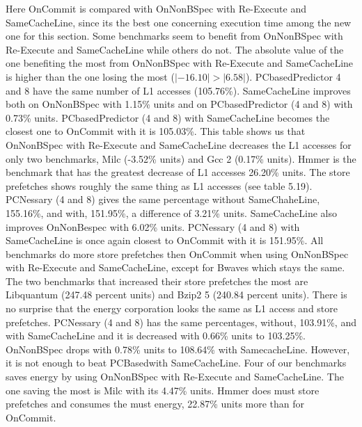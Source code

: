 Here OnCommit is compared with OnNonBSpec with Re-Execute and SameCacheLine, since its the best one concerning execution time among the new one for
this section. Some benchmarks seem to benefit from OnNonBSpec with Re-Execute and SameCacheLine while others do not. The absolute value of the one benefiting
the most from OnNonBSpec with Re-Execute and SameCacheLine is higher than the
one losing the most ($| − 16.10| > |6.58|$).
\resAcc
{}
PCbasedPredictor 4 and 8 have the same number of L1 accesses (105.76\%). SameCacheLine improves both on OnNonBSpec with 1.15\% units and on PCbasedPredictor (4 and 8) with 0.73\% units. PCbasedPredictor (4 and 8) with SameCacheLine
becomes the closest one to OnCommit with it is 105.03\%.
This table shows us that OnNonBSpec with Re-Execute and SameCacheLine decreases the L1 accesses for only two benchmarks, Milc (-3.52\% units) and Gcc 2 (0.17\% units). Hmmer is the benchmark that has the greatest decrease of L1 accesses
26.20\% units.
\resSp
{}
The store prefetches shows roughly the same thing as L1 accesses (see table 5.19).
PCNessary (4 and 8) gives the same percentage without SameChaheLine, 155.16\%,
and with, 151.95\%, a difference of 3.21\% units. SameCacheLine also improves OnNonBespec with 6.02\% units. PCNessary (4 and 8) with SameCacheLine is once again
closest to OnCommit with it is 151.95\%.
All benchmarks do more store prefetches then OnCommit when using OnNonBSpec with Re-Execute and SameCacheLine, except for Bwaves which stays the same.
The two benchmarks that increased their store prefetches the most are Libquantum
(247.48 percent units) and Bzip2 5 (240.84 percent units).
\resEnergy
{}
There is no surprise that the energy corporation looks the same as L1 access and
store prefetches. PCNessary (4 and 8) has the same percentages, without, 103.91\%,
and with SameCacheLine and it is decreased with 0.66\% units to 103.25\%. OnNonBSpec drops with 0.78\% units to 108.64\% with SamecacheLine. However, it is not
enough to beat PCBasedwith SameCacheLine.
 Four of our benchmarks saves energy by using OnNonBSpec with Re-Execute and
SameCacheLine. The one saving the most is Milc with its 4.47\% units. Hmmer does 
must store prefetches and consumes the must energy, 22.87\% units more than for
OnCommit.
